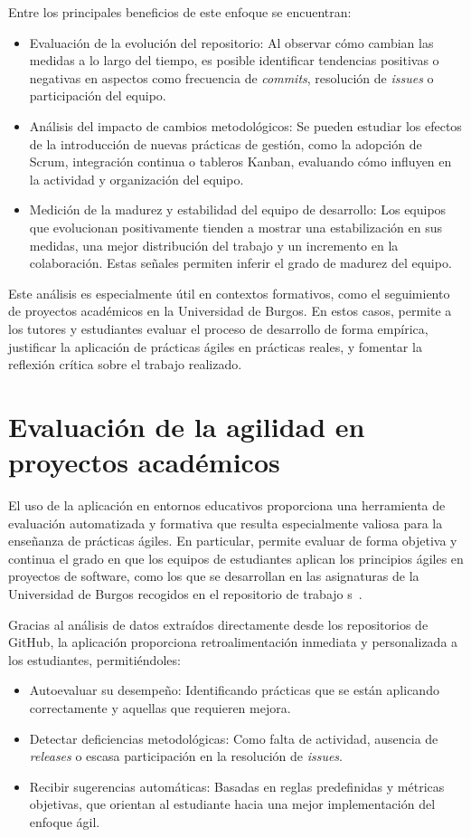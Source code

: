Entre los principales beneficios de este enfoque se encuentran:

\begin{itemize}
\item Evaluación de la evolución del repositorio: Al observar cómo cambian las medidas a lo largo del tiempo, es posible identificar tendencias positivas o negativas en aspectos como frecuencia de \textit{commits}, resolución de \textit{issues} o participación del equipo.
\item Análisis del impacto de cambios metodológicos: Se pueden estudiar los efectos de la introducción de nuevas prácticas de gestión, como la adopción de Scrum, integración continua o tableros Kanban, evaluando cómo influyen en la actividad y organización del equipo.
\item Medición de la madurez y estabilidad del equipo de desarrollo: Los equipos que evolucionan positivamente tienden a mostrar una estabilización en sus medidas, una mejor distribución del trabajo y un incremento en la colaboración. Estas señales permiten inferir el grado de madurez del equipo.
\end{itemize}

Este análisis es especialmente útil en contextos formativos, como el seguimiento de proyectos académicos en la Universidad de Burgos. En estos casos, permite a los tutores y estudiantes evaluar el proceso de desarrollo de forma empírica, justificar la aplicación de prácticas ágiles en prácticas reales, y fomentar la reflexión crítica sobre el trabajo realizado.

\section{Evaluación de la agilidad en proyectos académicos}
El uso de la aplicación en entornos educativos proporciona una herramienta de evaluación automatizada y formativa que resulta especialmente valiosa para la enseñanza de prácticas ágiles. En particular, permite evaluar de forma objetiva y continua el grado en que los equipos de estudiantes aplican los principios ágiles en proyectos de software, como los que se desarrollan en las asignaturas de la Universidad de Burgos recogidos en el repositorio de trabajo s~\cite{riubu}.

Gracias al análisis de datos extraídos directamente desde los repositorios de GitHub, la aplicación proporciona retroalimentación inmediata y personalizada a los estudiantes, permitiéndoles:

\begin{itemize}
\item Autoevaluar su desempeño: Identificando prácticas que se están aplicando correctamente y aquellas que requieren mejora.
\item Detectar deficiencias metodológicas: Como falta de actividad, ausencia de \textit{releases} o escasa participación en la resolución de \textit{issues}.
\item Recibir sugerencias automáticas: Basadas en reglas predefinidas y métricas objetivas, que orientan al estudiante hacia una mejor implementación del enfoque ágil.
\end{itemize}

